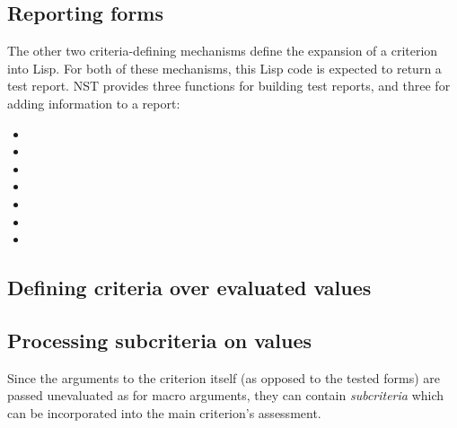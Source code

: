 \subsection{Reporting forms}
\label{sec:criteria-forms-report}
The other two criteria-defining mechanisms define the expansion of a
criterion into Lisp.  For both of these mechanisms, this Lisp code is
expected to return a test report.  NST provides three functions for
building test reports, and three for adding information to a report:
\begin{itemize}
\item
  
\item
  
\item
  
\item
  
\item
  
\item
  
\item
  
\end{itemize}

\subsection{Defining criteria over evaluated values}
\label{sec:def-criterion}
%

\subsection{Processing subcriteria on values}
\label{sec:subcriteria-values}
Since the arguments to the criterion itself (as opposed to the tested
forms) are passed unevaluated as for macro arguments, they can contain
\emph{subcriteria} which can be incorporated into the main criterion's
assessment.%
%

